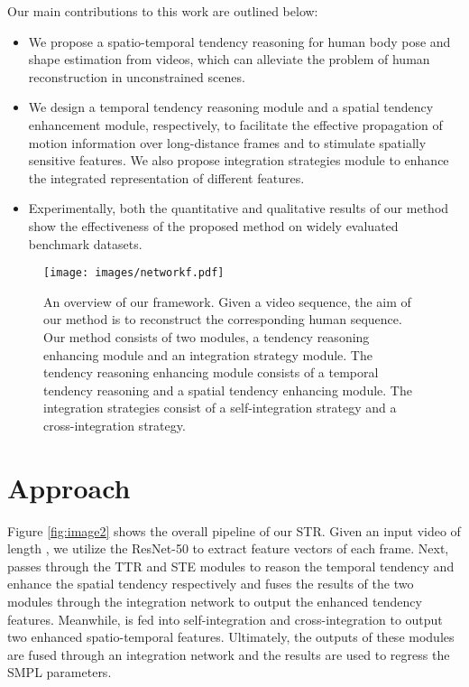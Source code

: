 \documentclass{bmvc2k}
\begin{document}
Our main contributions to this work are outlined below:
\begin{itemize}
\item We propose a spatio-temporal tendency reasoning for human body pose and shape estimation from videos, which can alleviate the problem of human reconstruction in unconstrained scenes.
\item We design a temporal tendency reasoning module and a spatial tendency enhancement module, respectively, to facilitate the effective propagation of motion information over long-distance frames and to stimulate spatially sensitive features. We also propose integration strategies module to enhance the integrated representation of different features.
\item Experimentally, both the quantitative and qualitative results of our method show the effectiveness of the proposed method on widely evaluated benchmark datasets.
\end{itemize}
\begin{figure*}
\centering
\texttt{[image: images/networkf.pdf]}
\caption{An overview of our framework. Given a video sequence, the aim of our method is to reconstruct the corresponding human sequence. Our method consists of two modules, a tendency reasoning enhancing module and an integration strategy module. The tendency reasoning enhancing module consists of a temporal tendency reasoning and a spatial tendency enhancing module. The integration strategies consist of a self-integration strategy and a cross-integration strategy. }\label{fig:image2}
\label{fig2}
\end{figure*}



\section{Approach}
Figure \ref{fig:image2} shows the overall pipeline of our STR. Given an input video  of length , we utilize the ResNet-50 \cite{he2016deep} to extract feature vectors  of each frame. Next,  passes through the TTR and STE modules to reason the temporal tendency and enhance the spatial tendency respectively and fuses the results of the two modules through the integration network to output the enhanced tendency features. Meanwhile,  is fed into self-integration and cross-integration to output two enhanced spatio-temporal features. Ultimately, the outputs of these modules are fused through an integration network and the results are used to regress the SMPL parameters.
\end{document}
